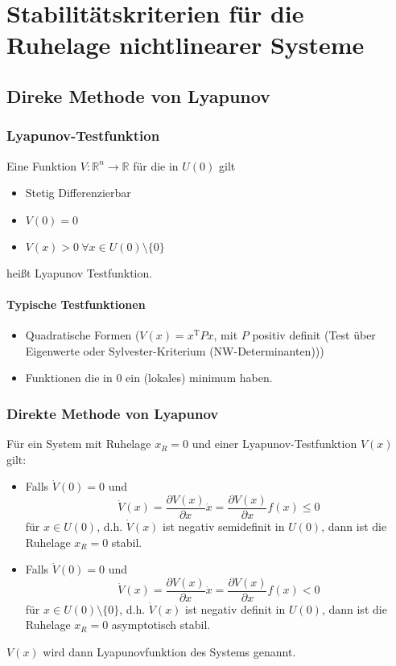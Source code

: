 \chapter{Stabilitätskriterien für die Ruhelage nichtlinearer Systeme}
\section{Direke Methode von Lyapunov}
\subsection{Lyapunov-Testfunktion}
Eine Funktion $V: \mathbb{R}^n \to \mathbb{R}$ für die in $U(0)$ gilt
\begin{itemize}
    \item Stetig Differenzierbar
    \item $V(0)=0$
    \item $V(x) > 0\ \forall x \in U(0)\setminus\{0\}$
\end{itemize}
heißt Lyapunov Testfunktion.

\subsubsection{Typische Testfunktionen}
\begin{itemize}
    \item
        Quadratische Formen ($V(x) = x^\text{T} P x$, mit $P$ positiv definit 
        (Test über Eigenwerte oder Sylvester-Kriterium (NW-Determinanten)))
    \item
        Funktionen die in $0$ ein (lokales) minimum haben.
\end{itemize}

\subsection{Direkte Methode von Lyapunov}
Für ein System mit Ruhelage $x_R=0$ und einer Lyapunov-Testfunktion $V(x)$ gilt:
\begin{itemize}
    \item
        Falls $\dot{V}(0) = 0$ und
        \begin{equation}
            \dot{V}(x) = \frac{\partial V(x)}{\partial x} \dot{x}
                = \frac{\partial V(x)}{\partial x} f(x) \leq 0 
        \end{equation}
        für $x \in U(0)$, d.h. $\dot{V}(x)$ ist negativ semidefinit in $U(0)$,
        dann ist die Ruhelage $x_R=0$ stabil.
    \item
        Falls $\dot{V}(0) = 0$ und
        \begin{equation}
            \dot{V}(x) = \frac{\partial V(x)}{\partial x} \dot{x}
                = \frac{\partial V(x)}{\partial x} f(x) < 0 
        \end{equation}
        für $x \in U(0)\setminus \{0\}$, d.h. $\dot{V}(x)$ ist negativ definit in $U(0)$,
        dann ist die Ruhelage $x_R=0$ asymptotisch stabil.
\end{itemize}
$V(x)$ wird dann Lyapunovfunktion des Systems genannt.

